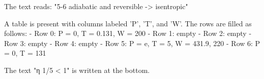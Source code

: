The text reads:
"5-6 adiabatic and reversible -> isentropic"

A table is present with columns labeled 'P', 'T', and 'W'. The rows are filled as follows:
- Row 0: P = 0, T = 0.131, W = 200
- Row 1: empty
- Row 2: empty
- Row 3: empty
- Row 4: empty
- Row 5: P = e, T = 5, W = 431.9, 220
- Row 6: P = 0, T = 131

The text "η 1/5 < 1" is written at the bottom.